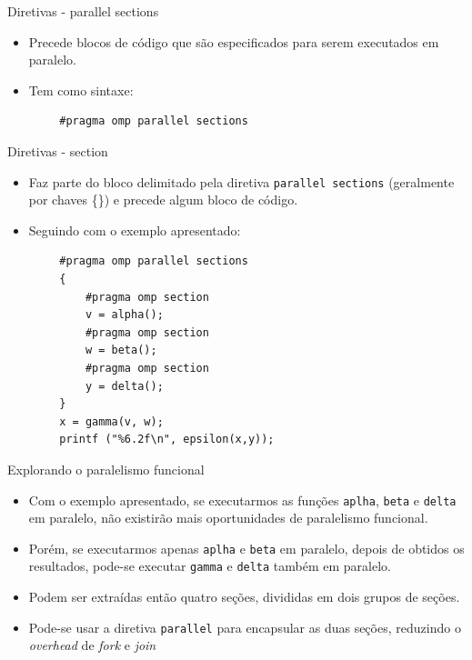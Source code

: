 \begin{frame}[fragile]{Diretivas - parallel sections}
	\begin{itemize}
		\item Precede blocos de código que são especificados para serem executados em paralelo.
		\medskip
		\item Tem como sintaxe:
		\medskip
	\end{itemize}
	\begin{verbatim}
		#pragma omp parallel sections
	\end{verbatim}
\end{frame}

\begin{frame}[fragile]{Diretivas - section}
	\begin{itemize}
		\item Faz parte do bloco delimitado pela diretiva \texttt{parallel sections} (geralmente por chaves \{\}) e precede algum bloco de código.
		\medskip
		\item Seguindo com o exemplo apresentado:
	\end{itemize}
	\begin{verbatim}
		#pragma omp parallel sections
		{
			#pragma omp section
			v = alpha();
			#pragma omp section
			w = beta();
			#pragma omp section
			y = delta();
		}
		x = gamma(v, w);
		printf ("%6.2f\n", epsilon(x,y));
	\end{verbatim}
\end{frame}

\begin{frame}{Explorando o paralelismo funcional}
	\begin{itemize}
		\item Com o exemplo apresentado, se executarmos as funções \texttt{aplha}, \texttt{beta} e \texttt{delta} em paralelo, não existirão mais oportunidades de paralelismo funcional.
		\pause
		\medskip
		\item Porém, se executarmos apenas \texttt{aplha} e \texttt{beta} em paralelo, depois de obtidos os resultados, pode-se executar \texttt{gamma} e \texttt{delta} também em paralelo.
		\medskip
		\item Podem ser extraídas então quatro seções, divididas em dois grupos de seções.
		\medskip
		\item Pode-se usar a diretiva \texttt{parallel} para encapsular as duas seções, reduzindo o \textit{overhead} de \textit{fork} e \textit{join}
	\end{itemize}
\end{frame}

